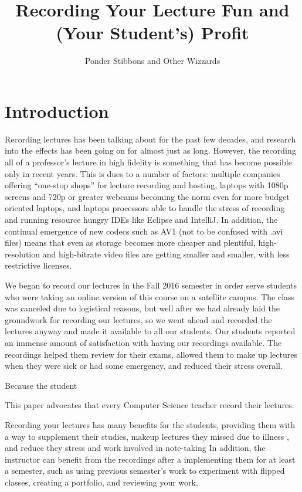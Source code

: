 \documentclass[sigconf]{acmart}
\title{Recording Your Lecture Fun and (Your Student's) Profit}
\author{Ponder Stibbons and Other Wizzards}
\affiliation{\institution{Unseen University}}
\begin{document}
\maketitle




\section{Introduction}
\label{why}



Recording lectures has been talking about for the past few decades, and research into the effects has been going on for almost just as long.
However, the recording all of a professor's lecture in high fidelity is something that has become possible only in recent years.
This is dues to a number of factors: multiple companies offering ``one-stop shops'' for lecture recording and hosting, laptops with 1080p screens and 720p or greater webcams becoming the norm even for more budget oriented laptops, and laptops processors able to handle the stress of recording and running resource hungry IDEs like Eclipse and IntelliJ.
In addition, the continual emergence of new codecs such as AV1 \cite{AV1comp} (not to be confused with .avi files) means that even as storage becomes more cheaper and plentiful, high-resolution and high-bitrate video files are getting smaller and smaller, with less restrictive licenses. 

We began to record our lectures in the Fall 2016 semester in order serve students who were taking an online version of this course on a satellite campus.
The class was canceled due to logistical reasons, but well after we had already laid the groundwork for recording our lectures, so we went ahead and recorded the lectures anyway and made it available to all our students.
Our students reported an immense amount of satisfaction with having our recordings available.
The recordings helped them review for their exams, allowed them to make up lectures when they were sick or had some emergency, and reduced their stress overall.

Because the student 








This paper advocates that every Computer Science teacher record their lectures.

Recording your lectures has many benefits for the students, providing them with a way to supplement their studies, makeup lectures they missed due to illness \cite{traphagan2010impact}, and reduce they stress and work involved in note-taking
In addition, the instructor can benefit from the recordings after a implementing them for at least a semester, such as using previous semester's work to experiment with flipped classes, creating a portfolio, and reviewing your work. 
\end{document}
